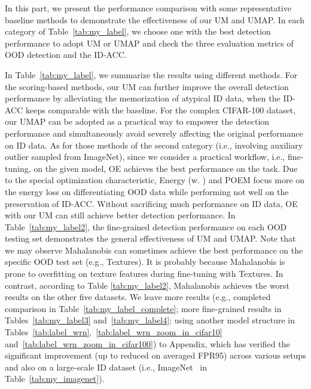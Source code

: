 \documentclass{article}
\theoremstyle{plain}
\theoremstyle{definition}
\theoremstyle{remark}
\begin{document}
In this part, we present the performance comparison with some representative baseline methods to demonstrate the effectiveness of our UM and UMAP. 
In each category of Table~\ref{tab:my_label}, we choose one with the best detection performance to adopt UM or UMAP and check the three evaluation metrics of OOD detection and the ID-ACC. 



In Table~\ref{tab:my_label}, we summarize the results using different methods. For the scoring-based methods, our UM can further improve the overall detection performance by alleviating the memorization of atypical ID data, when the ID-ACC keeps comparable with the baseline. For the complex CIFAR-100 dataset, our UMAP can be adopted as a practical way to empower the detection performance and simultaneously avoid severely affecting the original performance on ID data. As for those methods of the second category (i.e., involving auxiliary outlier  sampled from ImageNet), since we consider a practical workflow, i.e., fine-tuning, on the given model, OE achieves the best performance on the task. Due to the special optimization characteristic, Energy (w. ) and POEM focus more on the energy loss on differentiating OOD data while performing not well on the preservation of ID-ACC. Without sacrificing much performance on ID data, OE with our UM can still achieve better detection performance. In Table~\ref{tab:my_label2}, the fine-grained detection performance on each OOD testing set demonstrates the general effectiveness of UM and UMAP. Note that we may observe Mahalanobis can sometimes achieve the best performance on the specific OOD test set (e.g., Textures). It is probably because Mahalanobis is prone to overfitting on texture features during fine-tuning with Textures. In contrast, according to Table \ref{tab:my_label2}, Mahalanobis achieves the worst results on the other five datasets. We leave more results (e.g., completed comparison in Table~\ref{tab:my_label_complete}; more fine-grained results in Tables~\ref{tab:my_label3} and~\ref{tab:my_label4}; using another model structure in Tables~\ref{tab:label_wrn},~\ref{tab:label_wrn_zoom_in_cifar10} and~\ref{tab:label_wrn_zoom_in_cifar100}) to Appendix, which has verified the significant improvement (up to  reduced on averaged FPR95) across various setups and also on a large-scale ID dataset (i.e., ImageNet~\citep{deng2009imagenet} in Table~\ref{tab:my_imagenet}).
\end{document}
